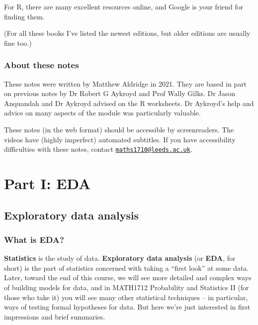 \documentclass[
  a4paper,
]{book}
\theoremstyle{definition}
\theoremstyle{definition}
\theoremstyle{definition}
\theoremstyle{definition}
\theoremstyle{remark}
\begin{document}
For R, there are many excellent resources online, and Google is your friend for finding them.

(For all these books I've listed the newest editions, but older editions are usually fine too.)

\hypertarget{about-notes}{%
\section*{About these notes}\label{about-notes}}

These notes were written by Matthew Aldridge in 2021. They are based in part on previous notes by Dr Robert G Aykroyd and Prof Wally Gilks. Dr Jason Anquandah and Dr Aykroyd advised on the R worksheets. Dr Aykroyd's help and advice on many aspects of the module was particularly valuable.

These notes (in the web format) should be accessible by screenreaders. The videos have (highly imperfect) automated subtitles. If you have accessibility difficulties with these notes, contact \href{mailto:maths1710@leeds.ac.uk}{\nolinkurl{maths1710@leeds.ac.uk}}.

\hypertarget{part-part-i-eda}{%
\part*{Part I: EDA}\label{part-part-i-eda}}

\hypertarget{S01-eda}{%
\chapter{Exploratory data analysis}\label{S01-eda}}

\hypertarget{what-is-eda}{%
\section{What is EDA?}\label{what-is-eda}}

\textbf{Statistics} is the study of data. \textbf{Exploratory data analysis} (or \textbf{EDA}, for short) is the part of statistics concerned with taking a ``first look'' at some data. Later, toward the end of this course, we will see more detailed and complex ways of building models for data, and in MATH1712 Probability and Statistics II (for those who take it) you will see many other statistical techniques -- in particular, ways of testing formal hypotheses for data. But here we're just interested in first impressions and brief summaries.
\end{document}
